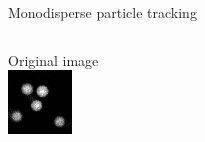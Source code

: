 \documentclass[xcolor=table]{beamer}
\begin{document}
\begin{frame}{Monodisperse particle tracking}
	\begin{columns}[T]
	Original image\\
	\includegraphics[width=\textwidth]{dillute_raw}
	

\end{columns}
\end{frame}
\end{document}
